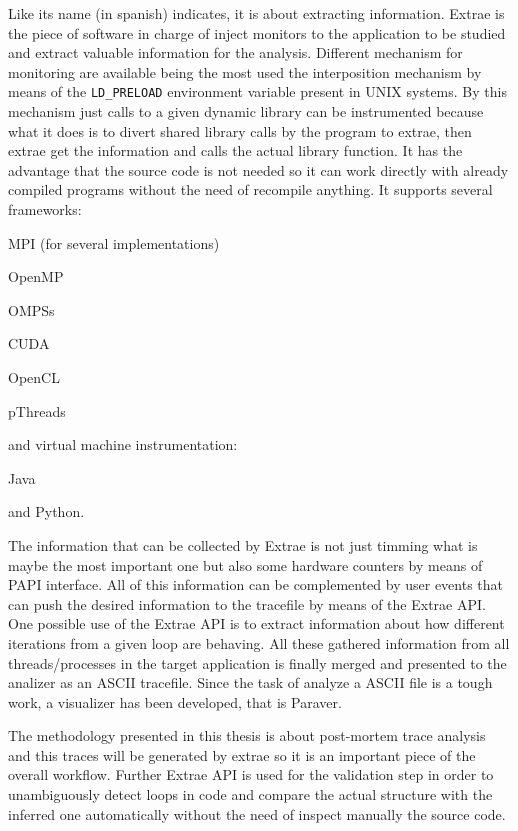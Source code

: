 Like its name (in spanish) indicates, it is about extracting information. Extrae is
the piece of software in charge of inject monitors to the application to
be studied and
extract valuable information for the analysis. Different mechanism for
monitoring are available being the most used the interposition mechanism by
means of the {\tt LD\_PRELOAD} environment variable present in UNIX systems.
By this mechanism just calls to a given dynamic library can be instrumented because
what it does is to divert shared library calls by the program to extrae, then 
extrae get the information and calls the actual library function. It has the
advantage that the source code is not needed so it can work directly with
already compiled programs without the need of recompile anything. It supports 
several frameworks: 
\begin{enumerate*}[label=\roman*)]
  \item MPI (for several implementations)
  \item OpenMP
  \item OMPSs
  \item CUDA
  \item OpenCL
  \item pThreads
\end{enumerate*}
and virtual machine instrumentation: 
\begin{enumerate*}[label=\roman*)]
  \item Java
  \item and Python.
\end{enumerate*}
The information that can be collected by Extrae is not just timming what is maybe
the most important one but also some hardware counters by means of PAPI
interface. All of this information can be complemented by user events that can
push the desired information to the tracefile by means of the Extrae API. One
possible use of the Extrae API is to extract information about how different
iterations from a given loop are behaving. All these gathered information from 
all threads/processes in the target application is finally merged and presented 
to the analizer as an ASCII tracefile. Since the task of analyze a ASCII file 
is a tough work, a visualizer has been developed, that is Paraver.

The methodology presented in this thesis is about post-mortem trace analysis and
this traces will be generated by extrae so it is an important piece of the
overall workflow. Further Extrae API is used for the validation step in order to
unambiguously detect loops in code and compare the actual structure with the
inferred one automatically without the need of inspect manually the source code.

